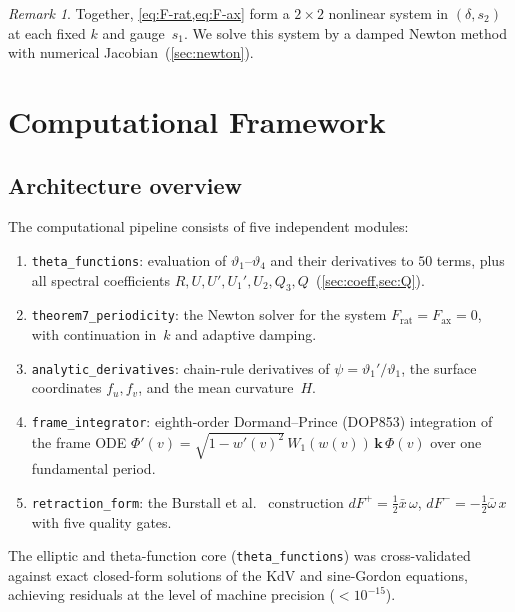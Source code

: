 \documentclass[11pt,a4paper]{article}
\theoremstyle{plain}
\theoremstyle{definition}
\theoremstyle{remark}
\newtheorem{remark}[theorem]{Remark}
\newcommand{\vt}[1]{\vartheta_{#1}}     %
\begin{document}
\begin{remark}
  Together, \cref{eq:F-rat,eq:F-ax} form a $2 \times 2$ nonlinear
  system in $(\delta, s_2)$ at each fixed $k$ and gauge~$s_1$.  We
  solve this system by a damped Newton method with numerical
  Jacobian~(\cref{sec:newton}).
\end{remark}


\section{Computational Framework}\label{sec:computational}

\subsection{Architecture overview}\label{sec:arch}
The computational pipeline consists of five independent modules:
\begin{enumerate}[nosep]
\item \texttt{theta\_functions}: evaluation of
  $\vt{1}$--$\vt{4}$ and their derivatives to $50$ terms,
  plus all spectral coefficients
  $R, U, U', U_1', U_2, Q_3, Q$~(\cref{sec:coeff,sec:Q}).
\item \texttt{theorem7\_periodicity}: the Newton solver for
  the system $F_{\mathrm{rat}} = F_{\mathrm{ax}} = 0$,
  with continuation in~$k$ and adaptive damping.
\item \texttt{analytic\_derivatives}: chain-rule derivatives
  of $\psi = \vt{1}'/\vt{1}$, the surface coordinates
  $f_u, f_v$, and the mean curvature~$H$.
\item \texttt{frame\_integrator}: eighth-order Dormand--Prince
  (DOP853) integration of the frame ODE
  $\Phi'(v) = \sqrt{1 - w'(v)^2}\,W_1(w(v))\,\mathbf{k}\,\Phi(v)$
  over one fundamental period.
\item \texttt{retraction\_form}: the Burstall et al.~\cite{BCHR25}
  construction $dF^+ = \tfrac12 \bar{x}\,\omega$,
  $dF^- = -\tfrac12 \bar{\omega}\,x$ with five quality gates.
\end{enumerate}
The elliptic and theta-function core (\texttt{theta\_functions})
was cross-validated against exact closed-form solutions of the
KdV and sine-Gordon equations, achieving residuals at the level
of machine precision ($< 10^{-15}$).
\end{document}
